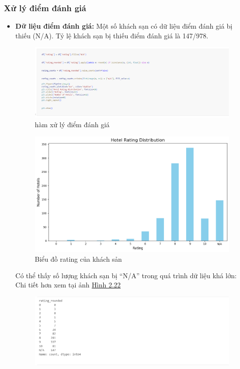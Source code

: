 \subsubsection{Xử lý điểm đánh giá}
\begin{itemize}
    \item \textbf{Dữ liệu điểm đánh giá:} Một số khách sạn có dữ liệu điểm đánh giá bị thiếu (N/A). Tỷ lệ khách sạn bị thiếu điểm đánh giá là 147/978. 
    \begin{figure}[H] %
        \centering
        \includegraphics[width=1.0\linewidth]{Figures/2.16.png}
        \caption{hàm xử lý điểm đánh giá}
        \label{fig:iot}
    \end{figure}
    \begin{figure}[H] %
        \centering
        \includegraphics[width=1.0\linewidth]{Figures/2.17.png}
        \caption{Biểu đồ rating của khách sản}
        \label{fig:iot}
    \end{figure}
    Có thể thấy số lượng khách sạn bị “N/A” trong quá trình dữ liệu khá lớn: Chi tiết hơn xem tại ảnh \hyperref[fig:image2.22]{Hình 2.22}
     \begin{figure} [h] %
        \centering
        \includegraphics[width=1.0\linewidth]{Figures/2.18.png}

\end{figure}
\end{itemize}
